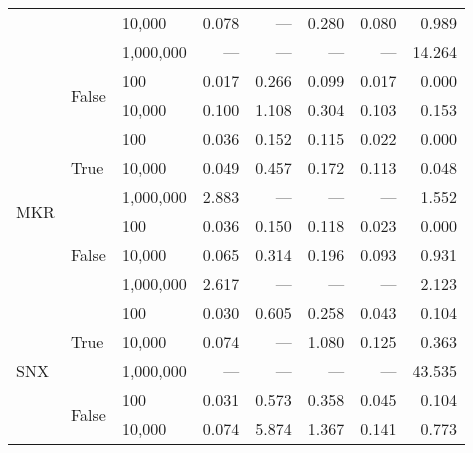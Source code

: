 \begin{tabular}{lllrrrrr}
                          &                        & 10,000          & 0.078   & ---    & 0.280 & 0.080 & 0.989   \\
                          &                        & 1,000,000       & ---     & ---    & ---   & ---   & 14.264  \\
    \cline{2-8}
                          & \multirow{2}{*}{False} & 100             & 0.017   & 0.266  & 0.099 & 0.017 & 0.000   \\
                          &                        & 10,000          & 0.100   & 1.108  & 0.304 & 0.103 & 0.153   \\
    \cline{1-8}
    \cline{2-8}
    \multirow{6}{*}{MKR}  & \multirow{3}{*}{True}  & 100             & 0.036   & 0.152  & 0.115 & 0.022 & 0.000   \\
                          &                        & 10,000          & 0.049   & 0.457  & 0.172 & 0.113 & 0.048   \\
                          &                        & 1,000,000       & 2.883   & ---    & ---   & ---   & 1.552   \\
    \cline{2-8}
                          & \multirow{3}{*}{False} & 100             & 0.036   & 0.150  & 0.118 & 0.023 & 0.000   \\
                          &                        & 10,000          & 0.065   & 0.314  & 0.196 & 0.093 & 0.931   \\
                          &                        & 1,000,000       & 2.617   & ---    & ---   & ---   & 2.123   \\
    \cline{1-8}
    \cline{2-8}
    \multirow{5}{*}{SNX}  & \multirow{3}{*}{True}  & 100             & 0.030   & 0.605  & 0.258 & 0.043 & 0.104   \\
                          &                        & 10,000          & 0.074   & ---    & 1.080 & 0.125 & 0.363   \\
                          &                        & 1,000,000       & ---     & ---    & ---   & ---   & 43.535  \\
    \cline{2-8}
                          & \multirow{2}{*}{False} & 100             & 0.031   & 0.573  & 0.358 & 0.045 & 0.104   \\
                          &                        & 10,000          & 0.074   & 5.874  & 1.367 & 0.141 & 0.773   \\
    \bottomrule
\end{tabular}
